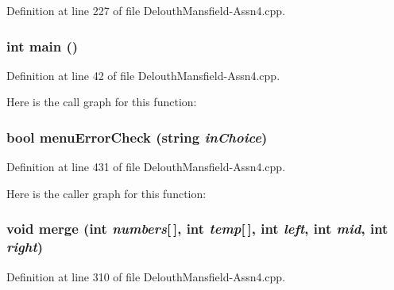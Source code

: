 Definition at line 227 of file DelouthMansfield-\/Assn4.cpp.

\hypertarget{_delouth_mansfield-_assn4_8cpp_ae66f6b31b5ad750f1fe042a706a4e3d4}{
\subsubsection[{main}]{\setlength{\rightskip}{0pt plus 5cm}int main ()}}
\label{_delouth_mansfield-_assn4_8cpp_ae66f6b31b5ad750f1fe042a706a4e3d4}


Definition at line 42 of file DelouthMansfield-\/Assn4.cpp.



Here is the call graph for this function:

\hypertarget{_delouth_mansfield-_assn4_8cpp_a3fcd92b059e256a9f46866c6d1e2b1e4}{
\subsubsection[{menuErrorCheck}]{\setlength{\rightskip}{0pt plus 5cm}bool menuErrorCheck (string {\em inChoice})}}
\label{_delouth_mansfield-_assn4_8cpp_a3fcd92b059e256a9f46866c6d1e2b1e4}


Definition at line 431 of file DelouthMansfield-\/Assn4.cpp.



Here is the caller graph for this function:

\hypertarget{_delouth_mansfield-_assn4_8cpp_a22dd5c604dfcb67bc46bfd4bbb97d2f0}{
\subsubsection[{merge}]{\setlength{\rightskip}{0pt plus 5cm}void merge (int {\em numbers}\mbox{[}$\,$\mbox{]}, \/  int {\em temp}\mbox{[}$\,$\mbox{]}, \/  int {\em left}, \/  int {\em mid}, \/  int {\em right})}}
\label{_delouth_mansfield-_assn4_8cpp_a22dd5c604dfcb67bc46bfd4bbb97d2f0}


Definition at line 310 of file DelouthMansfield-\/Assn4.cpp.



